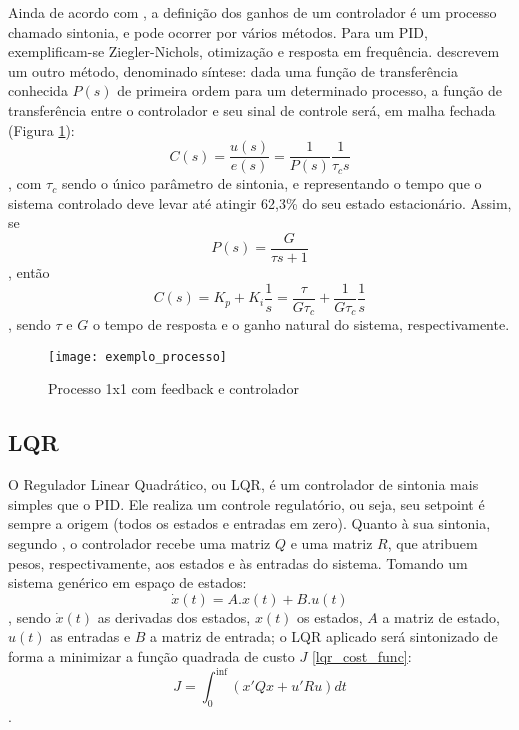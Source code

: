 Ainda de acordo com , a definição dos ganhos de um controlador é um processo chamado sintonia, e pode ocorrer por vários métodos. Para um PID, exemplificam-se Ziegler-Nichols, otimização e resposta em frequência.  descrevem um outro método, denominado síntese: dada uma função de transferência conhecida $P(s)$ de primeira ordem para um determinado processo, a função de transferência entre o controlador e seu sinal de controle será, em malha fechada (Figura \ref{img_exemplo_processo}):
\begin{equation}
C(s) = \frac{u(s)}{e(s)} = \frac{1}{P(s)} \frac{1}{\tau_c s}
\end{equation}
, com $\tau_c$ sendo o único parâmetro de sintonia, e representando o tempo que o sistema controlado deve levar até atingir 62,3\% do seu estado estacionário. Assim, se 
\begin{equation}
P(s) = \frac{G}{\tau s + 1}
\end{equation}
, então
\begin{equation}
C(s) = K_p + K_i \frac{1}{s} = \frac{\tau}{G \tau_c} + \frac{1}{G \tau_c} \frac{1}{s}
\label{sintese_controlador}
\end{equation}
, sendo $\tau$ e $G$ o tempo de resposta e o ganho natural do sistema, respectivamente.

\begin{figure}[hbt]
	\centering
	\caption{Processo 1x1 com feedback e controlador}
	\texttt{[image: exemplo\_processo]}
	\label{img_exemplo_processo}
\end{figure}

\subsection{LQR}

O Regulador Linear Quadrático, ou LQR, é um controlador de sintonia mais simples que o PID. Ele realiza um controle regulatório, ou seja, seu setpoint é sempre a origem (todos os estados e entradas em zero). Quanto à sua sintonia, segundo , o controlador recebe uma matriz $Q$ e uma matriz $R$, que atribuem pesos, respectivamente, aos estados e às entradas do sistema. Tomando um sistema genérico em espaço de estados:
\begin{equation}
\dot{x}(t) = A.x(t) + B.u(t)
\end{equation},
sendo $\dot{x}(t)$ as derivadas dos estados, $x(t)$ os estados, $A$ a matriz de estado, $u(t)$ as entradas e $B$ a matriz de entrada; o LQR aplicado será sintonizado de forma a minimizar a função quadrada de custo $J$ \ref{lqr_cost_func}:
\begin{equation}
J = \int_{0}^{\inf}(x'Qx + u'Ru)dt
\label{lqr_cost_func}
\end{equation}.


